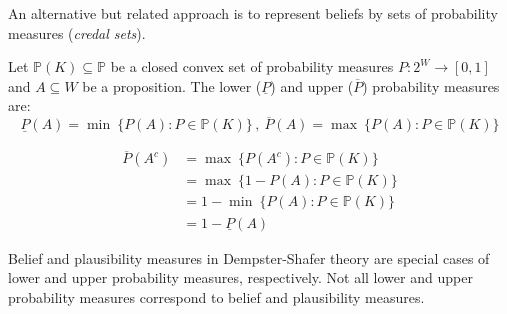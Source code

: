 An alternative but related approach is to represent beliefs by sets of
probability measures (\textit{credal sets}).

\begin{dfn}
  Let $\mathbb{P}(K) \subseteq \mathbb{P}$ be a closed convex set of probability
  measures $P : 2^W \rightarrow [0, 1]$ and $A \subseteq W$ be a proposition.
  The lower ($\underline{P}$) and upper ($\overline{P}$) probability measures are:
  \begin{equation}
    \underline{P}(A) = \min\ \{ P(A) : P \in \mathbb{P}(K) \}\,,\
    \overline{P}(A)  = \max\ \{ P(A) : P \in \mathbb{P}(K) \}
  \end{equation}
\end{dfn}

\begin{thm}
  \begin{align}
    \overline{P}(A^{c})
     & = \max\ \{ P(A^c) : P \in \mathbb{P}(K) \} \nonumber   \\
     & = \max\ \{ 1 - P(A) : P \in \mathbb{P}(K) \} \nonumber \\
     & = 1 - \min\ \{ P(A) : P \in \mathbb{P}(K) \} \nonumber \\
     & = 1 - \underline{P}(A)
  \end{align}
\end{thm}

Belief and plausibility measures in Dempster-Shafer theory are special cases of
lower and upper probability measures, respectively.
Not all lower and upper probability measures correspond to belief and
plausibility measures.

